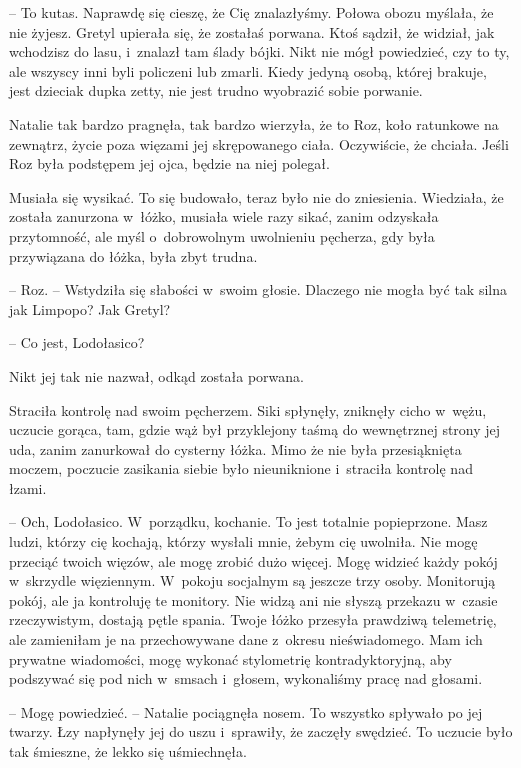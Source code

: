 \documentclass[oneside,polish,11pt,sfheadings]{mwbk}
\begin{document}
-- To kutas. Naprawdę się cieszę, że Cię znalazłyśmy. Połowa obozu
myślała, że nie żyjesz. Gretyl upierała się, że zostałaś porwana. Ktoś
sądził, że widział, jak wchodzisz do lasu, i~znalazł tam ślady bójki.
Nikt nie mógł powiedzieć, czy to ty, ale wszyscy inni byli policzeni lub
zmarli. Kiedy jedyną osobą, której brakuje, jest dzieciak dupka zetty,
nie jest trudno wyobrazić sobie porwanie.

Natalie tak bardzo pragnęła, tak bardzo wierzyła, że to Roz, koło
ratunkowe na zewnątrz, życie poza więzami jej skrępowanego ciała.
Oczywiście, że chciała. Jeśli Roz była podstępem jej ojca, będzie na
niej polegał.

Musiała się wysikać. To się budowało, teraz było nie do zniesienia.
Wiedziała, że została zanurzona w~łóżko, musiała wiele razy sikać, zanim
odzyskała przytomność, ale myśl o~dobrowolnym uwolnieniu pęcherza, gdy
była przywiązana do łóżka, była zbyt trudna.

-- Roz. -- Wstydziła się słabości w~swoim głosie. Dlaczego nie mogła być
tak silna jak Limpopo? Jak Gretyl?

-- Co jest, Lodołasico?

Nikt jej tak nie nazwał, odkąd została porwana.

Straciła kontrolę nad swoim pęcherzem. Siki spłynęły, zniknęły cicho w~wężu, uczucie gorąca, tam, gdzie wąż był przyklejony taśmą do
wewnętrznej strony jej uda, zanim zanurkował do cysterny łóżka. Mimo że
nie była przesiąknięta moczem, poczucie zasikania siebie było
nieuniknione i~straciła kontrolę nad łzami.

-- Och, Lodołasico. W~porządku, kochanie. To jest totalnie popieprzone.
Masz ludzi, którzy cię kochają, którzy wysłali mnie, żebym cię uwolniła.
Nie mogę przeciąć twoich więzów, ale mogę zrobić dużo więcej. Mogę
widzieć każdy pokój w~skrzydle więziennym. W~pokoju socjalnym są jeszcze
trzy osoby. Monitorują pokój, ale ja kontroluję te monitory. Nie widzą
ani nie słyszą przekazu w~czasie rzeczywistym, dostają pętle spania.
Twoje łóżko przesyła prawdziwą telemetrię, ale zamieniłam je na
przechowywane dane z~okresu nieświadomego. Mam ich prywatne wiadomości,
mogę wykonać stylometrię kontradyktoryjną, aby podszywać się pod nich w~smsach i~głosem, wykonaliśmy pracę nad głosami.

-- Mogę powiedzieć. -- Natalie pociągnęła nosem. To wszystko spływało po
jej twarzy. Łzy napłynęły jej do uszu i~sprawiły, że zaczęły swędzieć.
To uczucie było tak śmieszne, że lekko się uśmiechnęła.
\end{document}
